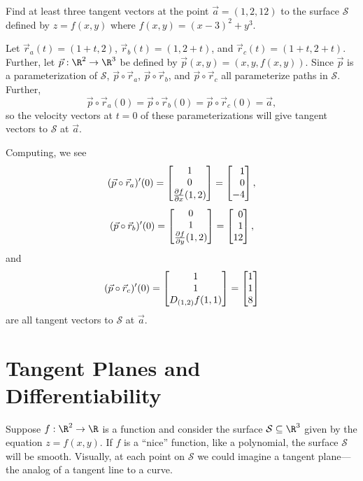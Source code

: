\begin{example}
	Find at least three tangent vectors at the point $\vec a=(1,2,12)$
	to the surface $\mathcal S$ defined by $z=f(x,y)$ where $f(x,y)=(x-3)^2+y^3$.

	Let $\vec r_a(t) = (1+t,2)$, $\vec r_b(t)=(1,2+t)$, and $\vec r_c(t)=
	(1+t,2+t)$.  Further, let $\vec p:\R^2\to\R^3$ be defined by $\vec p(x,y)=
	(x,y,f(x,y))$.  Since $\vec p$ is a parameterization of $\mathcal S$,
	$\vec p\circ \vec r_a$, $\vec p\circ \vec r_b$, 
	and $\vec p\circ \vec r_c$ all parameterize paths in $\mathcal S$.  Further,
	\[\vec p\circ \vec r_a(0)=\vec p\circ \vec r_b(0)=\vec p\circ \vec r_c(0)=\vec a,\]
	so the velocity vectors at $t=0$ of these parameterizations will give 
	tangent vectors to $\mathcal S$ at $\vec a$.
	
	Computing, we see
	\[
	(\vec p\circ \vec r_a)'(0)
	= \matc{1\\0\\\frac{\partial f}{\partial x}(1,2)} = \mat{1\\0\\-4},
	\]
	\[
	(\vec p\circ \vec r_b)'(0)
	= \matc{0\\1\\\frac{\partial f}{\partial y}(1,2)} = \mat{0\\1\\12},
	\]
	and
	\[
	(\vec p\circ \vec r_c)'(0)
	= \matc{1\\1\\ D_{(1,2)}f(1,1)} = \mat{1\\1\\8}
	\]
	are all tangent vectors to $\mathcal S$ at $\vec a$.
\end{example}



\begin{exercises}
\end{exercises}

\section{Tangent Planes and Differentiability}

Suppose $f:\R^2\to\R$ is a function and consider the surface $\mathcal S\subseteq \R^3$
given by the equation $z=f(x,y)$.  If $f$ is a ``nice'' function, like a polynomial, 
the surface $\mathcal S$ will be smooth.  Visually, at each point on $\mathcal S$ we
could imagine a tangent plane---the analog of a tangent line to a curve.


